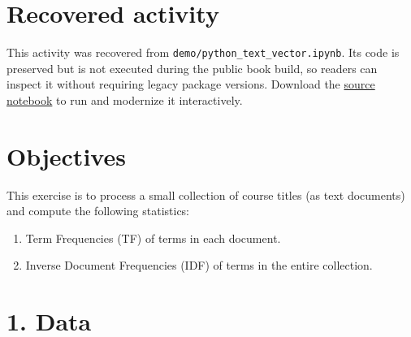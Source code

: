 \documentclass[
  letterpaper,
]{scrbook}
\providecommand{\tightlist}{%
  \setlength{\itemsep}{0pt}\setlength{\parskip}{0pt}}
\begin{document}

\section*{Recovered activity}\label{sec-lab-text-vectorization}


\begin{tcolorbox}[enhanced jigsaw, arc=.35mm, bottomrule=.15mm, bottomtitle=1mm, breakable, colback=white, colbacktitle=quarto-callout-note-color!10!white, colframe=quarto-callout-note-color-frame, coltitle=black, left=2mm, leftrule=.75mm, opacityback=0, opacitybacktitle=0.6, rightrule=.15mm, title=\textcolor{quarto-callout-note-color}{\faInfo}\hspace{0.5em}{Historical source and execution note}, titlerule=0mm, toprule=.15mm, toptitle=1mm]

This activity was recovered from
\texttt{demo/python\_text\_vector.ipynb}. Its code is preserved but is
not executed during the public book build, so readers can inspect it
without requiring legacy package versions. Download the
\href{../notebooks/text-vectorization.ipynb}{source notebook} to run and
modernize it interactively.

\end{tcolorbox}

\section*{Objectives}\label{objectives-1}


This exercise is to process a small collection of course titles (as text
documents) and compute the following statistics:

\begin{enumerate}
\def\labelenumi{\arabic{enumi}.}
\tightlist
\item
  Term Frequencies (TF) of terms in each document.
\item
  Inverse Document Frequencies (IDF) of terms in the entire collection.
\end{enumerate}

\section*{1. Data}\label{data-2}
\end{document}

